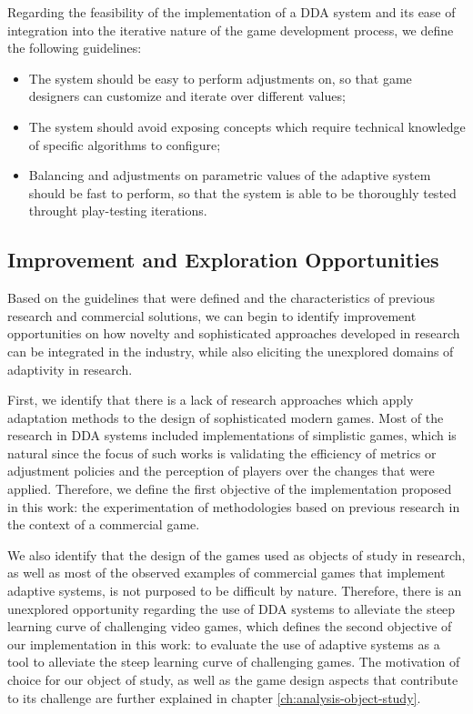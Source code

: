Regarding the feasibility of the implementation of a DDA system and its ease of integration into the iterative nature of the game development process, we define the following guidelines:
\begin{itemize}
    \item{The system should be easy to perform adjustments on, so that game designers can customize and iterate over different values;}
    \item{The system should avoid exposing concepts which require technical knowledge of specific algorithms to configure;}
    \item{Balancing and adjustments on parametric values of the adaptive system should be fast to perform, so that the system is able to be thoroughly tested throught play-testing iterations.}
\end{itemize}

\subsection{Improvement and Exploration Opportunities}
\label{sec:exploration-opportunities}

Based on the guidelines that were defined and the characteristics of previous research and commercial solutions, we can begin to identify improvement opportunities on how novelty and sophisticated approaches developed in research can be integrated in the industry, while also eliciting the unexplored domains of adaptivity in research.

First, we identify that there is a lack of research approaches which apply adaptation methods to the design of sophisticated modern games. Most of the research in DDA systems included implementations of simplistic games, which is natural since the focus of such works is validating the efficiency of metrics or adjustment policies and the perception of players over the changes that were applied. Therefore, we define the first objective of the implementation proposed in this work: the experimentation of methodologies based on previous research in the context of a commercial game.

We also identify that the design of the games used as objects of study  in research, as well as most of the observed examples of commercial games that implement adaptive systems, is not purposed to be difficult by nature. Therefore, there is an unexplored opportunity regarding the use of DDA systems to alleviate the steep learning curve of challenging video games, which defines the second objective of our implementation in this work: to evaluate the use of adaptive systems as a tool to alleviate the steep learning curve of challenging games. The motivation of choice for our object of study, as well as the game design aspects that contribute to its challenge are further explained in chapter \ref{ch:analysis-object-study}.

